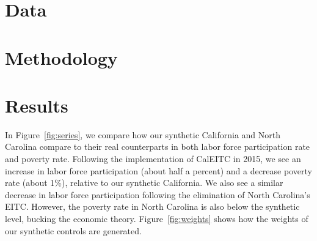 \documentclass{article}
\begin{document}
\section{Data}


\section{Methodology}


\section{Results}

In Figure~\ref{fig:series}, we compare how our synthetic California and North Carolina compare to their real counterparts in both labor force participation rate and poverty rate. Following the implementation of CalEITC in 2015, we see an increase in labor force participation (about half a percent) and a decrease poverty rate (about 1\%), relative to our synthetic California. We also see a similar decrease in labor force participation following the elimination of North Carolina's EITC. However, the poverty rate in North Carolina is also below the synthetic level, bucking the economic theory. Figure~\ref{fig:weights} shows how the weights of our synthetic controls are generated. 

\end{document}
